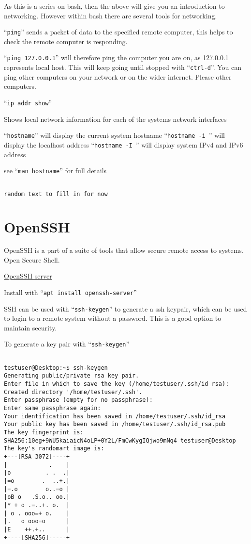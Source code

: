 \documentclass{extbook}
\begin{document}
As this is a series on bash,  then the above will give you an introduction to networking.  However within bash there are several tools for networking.

``\verb|ping|'' sends a packet of data to the specified remote computer, this helps to check the remote computer is responding.

``\verb|ping 127.0.0.1|'' will therefore ping the computer you are on,  as 127.0.0.1 represents local host.  This will keep going until stopped with ``\verb|ctrl-d|''.  You can ping other computers on your network or on the wider internet.  Please  other computers.

``\verb|ip addr show|''

Shows local network information for each of the systems network interfaces

``\verb|hostname|'' will display the current system hostname
``\verb|hostname -i |'' will display the localhost address
``\verb|hostname -I |'' will display system IPv4 and IPv6 address

see ``\verb|man hostname|'' for full details

\begin{verbatim}

random text to fill in for now

\end{verbatim}



\section{OpenSSH}

OpenSSH is a part of a suite of tools that allow secure remote access to systems.  Open Secure Shell.

\href{https://www.openssh.com/}{OpenSSH server}

Install with ``\verb|apt install openssh-server|''

SSH can be used with ``\verb|ssh-keygen|'' to generate a ssh keypair, which can be used to login to a remote system without a password.    This is a good option to maintain security. 

To generate a key pair with ``\verb|ssh-keygen|''


\begin{verbatim}

testuser@Desktop:~$ ssh-keygen
Generating public/private rsa key pair.
Enter file in which to save the key (/home/testuser/.ssh/id_rsa): 
Created directory '/home/testuser/.ssh'.
Enter passphrase (empty for no passphrase): 
Enter same passphrase again: 
Your identification has been saved in /home/testuser/.ssh/id_rsa
Your public key has been saved in /home/testuser/.ssh/id_rsa.pub
The key fingerprint is:
SHA256:10eg+9WU5kaiaicN4oLP+0Y2L/FmCwKygIQjwo9mNq4 testuser@Desktop
The key's randomart image is:
+---[RSA 3072]----+
|            .    |
|o          . .  .|
|=o        .  ..+.|
|=.o        o..=o |
|oB o   .S.o.. oo.|
|* + o .=..+. o.  |
| o . ooo=+ o.    |
|.   o ooo=o      |
|E    ++.+..      |
+----[SHA256]-----+

\end{verbatim}
\end{document}
